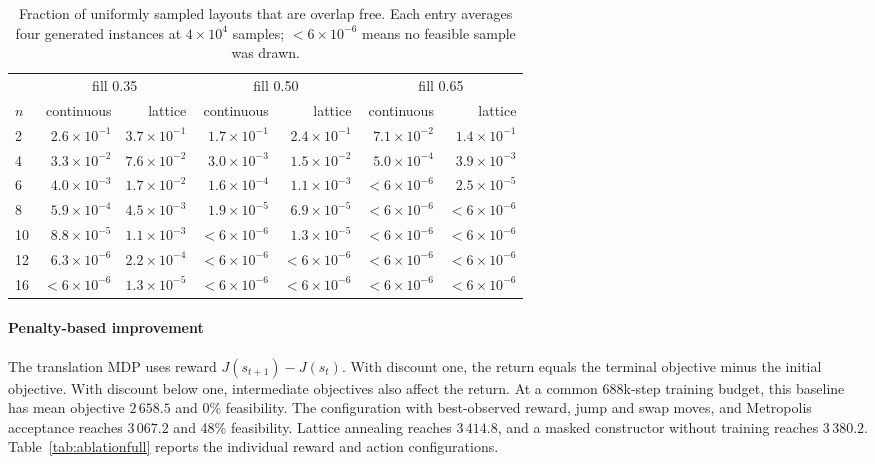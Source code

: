\documentclass[11pt]{article}
\begin{document}
\begin{table}[htbp]
\centering
\caption{Fraction of uniformly sampled layouts that are overlap free. Each
entry averages four generated instances at $4\times10^4$ samples; $<6\times
10^{-6}$ means no feasible sample was drawn.}
\label{tab:sfeasvol}
\scriptsize
\setlength{\tabcolsep}{3pt}
\begin{tabular}{@{}lrrrrrr@{}}
\toprule
 & \multicolumn{2}{c}{fill 0.35} & \multicolumn{2}{c}{fill 0.50}
 & \multicolumn{2}{c}{fill 0.65} \\
\cmidrule(lr){2-3}\cmidrule(lr){4-5}\cmidrule(lr){6-7}
$n$ & continuous & lattice & continuous & lattice & continuous & lattice \\
\midrule
2  & $2.6\times10^{-1}$ & $3.7\times10^{-1}$ & $1.7\times10^{-1}$ & $2.4\times10^{-1}$ & $7.1\times10^{-2}$ & $1.4\times10^{-1}$ \\
4  & $3.3\times10^{-2}$ & $7.6\times10^{-2}$ & $3.0\times10^{-3}$ & $1.5\times10^{-2}$ & $5.0\times10^{-4}$ & $3.9\times10^{-3}$ \\
6  & $4.0\times10^{-3}$ & $1.7\times10^{-2}$ & $1.6\times10^{-4}$ & $1.1\times10^{-3}$ & $<6\times10^{-6}$ & $2.5\times10^{-5}$ \\
8  & $5.9\times10^{-4}$ & $4.5\times10^{-3}$ & $1.9\times10^{-5}$ & $6.9\times10^{-5}$ & $<6\times10^{-6}$ & $<6\times10^{-6}$ \\
10 & $8.8\times10^{-5}$ & $1.1\times10^{-3}$ & $<6\times10^{-6}$ & $1.3\times10^{-5}$ & $<6\times10^{-6}$ & $<6\times10^{-6}$ \\
12 & $6.3\times10^{-6}$ & $2.2\times10^{-4}$ & $<6\times10^{-6}$ & $<6\times10^{-6}$ & $<6\times10^{-6}$ & $<6\times10^{-6}$ \\
16 & $<6\times10^{-6}$ & $1.3\times10^{-5}$ & $<6\times10^{-6}$ & $<6\times10^{-6}$ & $<6\times10^{-6}$ & $<6\times10^{-6}$ \\
\bottomrule
\end{tabular}
\end{table}

\paragraph{Penalty-based improvement}
The translation MDP uses reward
$J(s_{t+1})-J(s_t)$. With discount one, the return equals the terminal
objective minus the initial objective. With discount below one, intermediate
objectives also affect the return. At a common 688k-step training budget,
this baseline has mean objective $2\,658.5$ and 0\% feasibility. The
configuration with best-observed reward, jump and swap moves, and Metropolis
acceptance reaches $3\,067.2$ and 48\% feasibility. Lattice annealing reaches
$3\,414.8$, and a masked constructor without training reaches $3\,380.2$.
Table~\ref{tab:ablationfull} reports the individual reward and action
configurations.
\end{document}
